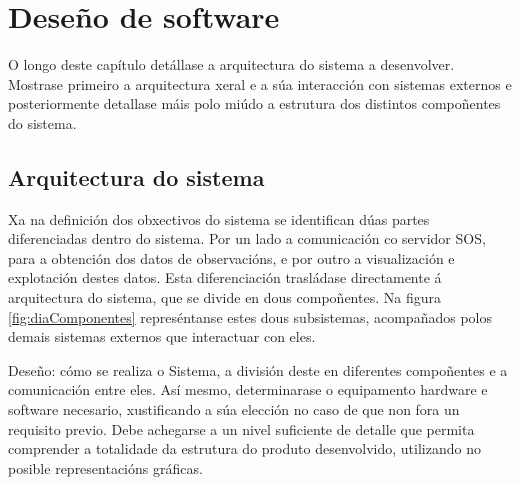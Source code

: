 \chapter{Deseño de software}
O longo deste capítulo detállase a arquitectura do sistema a desenvolver. Mostrase primeiro a arquitectura xeral e a súa interacción con sistemas externos e posteriormente detallase máis polo miúdo a estrutura dos distintos compoñentes do sistema.

\section{Arquitectura do sistema}
Xa na definición dos obxectivos do sistema se identifican dúas partes diferenciadas dentro do sistema. Por un lado a comunicación co servidor SOS, para a obtención dos datos de observacións, e por outro a visualización e explotación destes datos. Esta diferenciación trasládase directamente á arquitectura do sistema, que se divide en dous compoñentes. Na figura \ref{fig:diaComponentes} represéntanse estes dous subsistemas, acompañados polos demais sistemas externos que interactuar con eles. 

Deseño: cómo se realiza o Sistema, a división deste en diferentes compoñentes e a comunicación entre eles. Así mesmo, determinarase o equipamento hardware e software necesario, xustificando a súa elección no caso de que non fora un requisito previo. Debe achegarse a un nivel suficiente de detalle que permita comprender a totalidade da estrutura do produto desenvolvido, utilizando no  posible representacións gráficas.
